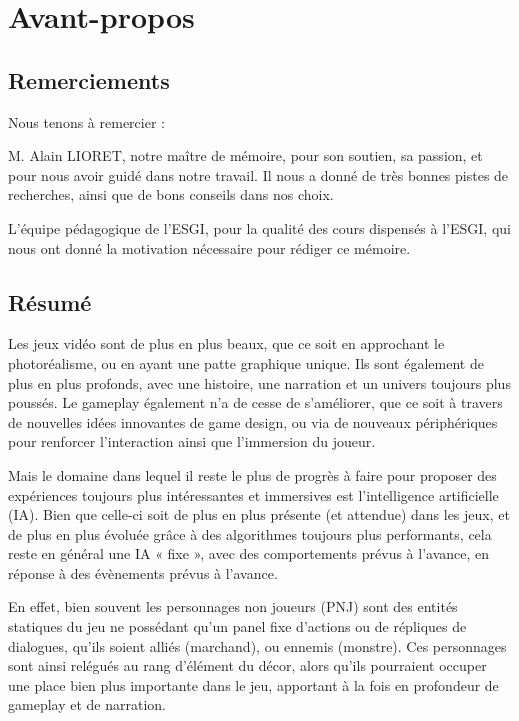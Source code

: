 \documentclass[a4paper, 12pt]{article} %
\begin{document}

\tableofcontents
\newpage
\section{Avant-propos}
\subsection{Remerciements}
Nous tenons à remercier :

M. Alain LIORET, notre maître de mémoire, pour son soutien, sa passion, et pour nous avoir guidé dans notre travail. Il nous a donné de très bonnes pistes de recherches, ainsi que de bons conseils dans nos choix.

L’équipe pédagogique de l’ESGI, pour la qualité des cours dispensés à l’ESGI, qui nous ont donné la motivation nécessaire pour rédiger ce mémoire.

\newpage
\subsection{Résumé}
Les jeux vidéo sont de plus en plus beaux, que ce soit en approchant le photoréalisme, ou en ayant une patte graphique unique. Ils sont également de plus en plus profonds, avec une histoire, une narration et un univers toujours plus poussés. Le gameplay également n’a de cesse de s’améliorer, que ce soit à travers de nouvelles idées innovantes de game design, ou via de nouveaux périphériques pour renforcer l’interaction ainsi que l’immersion du joueur. 

Mais le domaine dans lequel il reste le plus de progrès à faire pour proposer des expériences toujours plus intéressantes et immersives est l’intelligence artificielle (IA). Bien que celle-ci soit de plus en plus présente (et attendue) dans les jeux, et de plus en plus évoluée grâce à des algorithmes toujours plus performants, cela reste en général une IA « fixe », avec des comportements prévus à l’avance, en réponse à des évènements prévus à l’avance.

En effet, bien souvent les personnages non joueurs (PNJ) sont des entités statiques du jeu ne possédant qu’un panel fixe d’actions ou de répliques de dialogues, qu’ils soient alliés (marchand), ou ennemis (monstre). Ces personnages sont ainsi relégués au rang d’élément du décor, alors qu’ils pourraient occuper une place bien plus importante dans le jeu, apportant à la fois en profondeur de gameplay et de narration.
\end{document}
